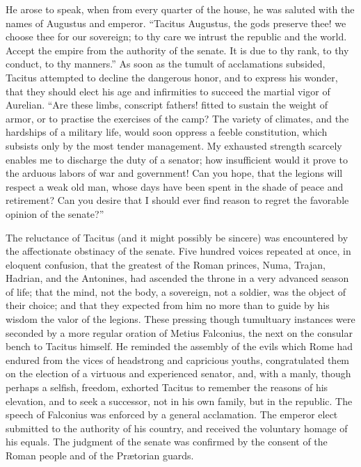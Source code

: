 
He arose to speak, when from every quarter of the house, he was
saluted with the names of Augustus and emperor. “Tacitus
Augustus, the gods preserve thee! we choose thee for our
sovereign; to thy care we intrust the republic and the world.
Accept the empire from the authority of the senate. It is due to
thy rank, to thy conduct, to thy manners.” As soon as the tumult
of acclamations subsided, Tacitus attempted to decline the
dangerous honor, and to express his wonder, that they should
elect his age and infirmities to succeed the martial vigor of
Aurelian. “Are these limbs, conscript fathers! fitted to sustain
the weight of armor, or to practise the exercises of the camp?
The variety of climates, and the hardships of a military life,
would soon oppress a feeble constitution, which subsists only by
the most tender management. My exhausted strength scarcely
enables me to discharge the duty of a senator; how insufficient
would it prove to the arduous labors of war and government! Can
you hope, that the legions will respect a weak old man, whose
days have been spent in the shade of peace and retirement? Can
you desire that I should ever find reason to regret the favorable
opinion of the senate?”\footnotemark[10]


The reluctance of Tacitus (and it might possibly be sincere) was
encountered by the affectionate obstinacy of the senate. Five
hundred voices repeated at once, in eloquent confusion, that the
greatest of the Roman princes, Numa, Trajan, Hadrian, and the
Antonines, had ascended the throne in a very advanced season of
life; that the mind, not the body, a sovereign, not a soldier,
was the object of their choice; and that they expected from him
no more than to guide by his wisdom the valor of the legions.
These pressing though tumultuary instances were seconded by a
more regular oration of Metius Falconius, the next on the
consular bench to Tacitus himself. He reminded the assembly of
the evils which Rome had endured from the vices of headstrong and
capricious youths, congratulated them on the election of a
virtuous and experienced senator, and, with a manly, though
perhaps a selfish, freedom, exhorted Tacitus to remember the
reasons of his elevation, and to seek a successor, not in his own
family, but in the republic. The speech of Falconius was enforced
by a general acclamation. The emperor elect submitted to the
authority of his country, and received the voluntary homage of
his equals. The judgment of the senate was confirmed by the
consent of the Roman people and of the Prætorian guards.\footnotemark[11]

